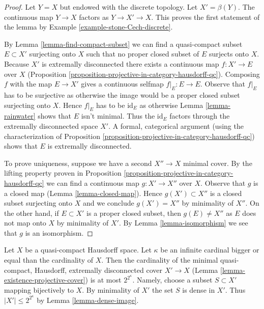 \begin{proof}
Let $Y = X$ but endowed with the discrete topology. Let $X' = \beta(Y)$.
The continuous map $Y \to X$ factors as $Y \to X' \to X$. This
proves the first statement of the lemma by
Example \ref{example-stone-Cech-discrete}.

\medskip\noindent
By Lemma \ref{lemma-find-compact-subset} we can find a quasi-compact subset
$E \subset X'$ surjecting onto $X$ such that no proper closed subset of $E$
surjects onto $X$.
Because $X'$ is extremally disconnected there exists a continuous map
$f : X' \to E$ over $X$
(Proposition \ref{proposition-projective-in-category-hausdorff-qc}).
Composing $f$ with the map $E \to X'$ gives a continuous selfmap
$f|_E : E \to E$. Observe that $f|_E$ has to be surjective as otherwise
the image would be a proper closed subset surjecting onto $X$.
Hence $f|_E$ has to be $\text{id}_E$ as otherwise
Lemma \ref{lemma-rainwater} shows that $E$ isn't minimal.
Thus the $\text{id}_E$ factors through the extremally disconnected
space $X'$. A formal, categorical argument (using the characterization of
Proposition \ref{proposition-projective-in-category-hausdorff-qc})
shows that $E$ is extremally disconnected.

\medskip\noindent
To prove uniqueness, suppose we have a second $X'' \to X$
minimal cover. By the lifting property proven in
Proposition \ref{proposition-projective-in-category-hausdorff-qc}
we can find a continuous map $g : X' \to X''$ over $X$.
Observe that $g$ is a closed map (Lemma \ref{lemma-closed-map}).
Hence $g(X') \subset X''$ is a closed subset surjecting onto $X$
and we conclude $g(X') = X''$ by minimality of $X''$.
On the other hand, if $E \subset X'$ is a proper closed subset,
then $g(E) \not = X''$ as $E$ does not map onto $X$ by minimality
of $X'$. By Lemma \ref{lemma-isomorphism} we see that $g$ is an isomorphism.
\end{proof}

\begin{remark}
\label{remark-size-projective-cover}
Let $X$ be a quasi-compact Hausdorff space. Let $\kappa$ be an infinite
cardinal bigger or equal than the cardinality of $X$. Then the cardinality
of the minimal quasi-compact, Hausdorff, extremally disconnected cover
$X' \to X$ (Lemma \ref{lemma-existence-projective-cover})
is at most $2^{2^\kappa}$. Namely, choose a subset $S \subset X'$
mapping bijectively to $X$. By minimality of $X'$ the set $S$ is dense
in $X'$. Thus $|X'| \leq 2^{2^\kappa}$ by Lemma \ref{lemma-dense-image}.
\end{remark}






